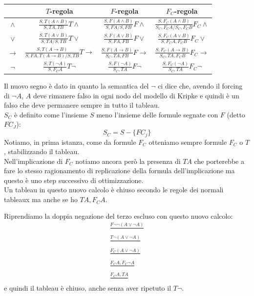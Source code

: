 \documentclass[a4paper,12pt, oneside]{book}
\begin{document}
\begin{table}[H]
  \large
  \centering
  \begin{tabular}{c||c|c|c}
    & {\small{$T$-regola}}& {\small{$F$-regola}} & {\small{$F_C$-regola}}\\
    \hline
    \hline
    $\land$ & $\frac{S,T(A\land B)}{S,TA,TB}T\land$&
              $\frac{S,F(A\land B)}{S,FA/S,FB}F\land$&
              $\frac{S,F_C(A\land B)}{S_C,F_CA/S_C,F_CB}F_C\land$\\ 
    \hline
    $\lor$ & $\frac{S,T(A\lor B)}{S,TA/S,TB}T\lor$&
                        $\frac{S,F(A\lor B)}{S,FA,FB}F\lor$&
                        $\frac{S,F_C(A\lor B)}{S,F_CA,F_CB}F_C\lor$\\
    \hline
    $\to$ & $\frac{S,T(A\to B)}{S,FA, T(A\to B)/S,TB}T\to$&
                        $\frac{S,F(A\to B)}{S_C,TA,FB}F\to$&
                        $\frac{S,F_C(A\to B)}{S_C,TA,F_CB}F_C\to$\\
    \hline
    $\neg$ & $\frac{S,T(\neg A)}{S,F_CA}T\neg$&
                        $\frac{S,F(\neg A)}{S_C,TA}F\neg$&
                        $\frac{S,F_C(\neg A)}{S_C,TA}F_C\neg$\\
    \hline
  \end{tabular}
\end{table}
Il nuovo segno è dato in quanto la semantica del $\neg$ ci dice che, avendo il
forcing di $\neg A$, $A$ deve rimanere falso in ogni nodo del modello di Kripke
e quindi è un falso che deve permanere sempre in tutto il tableau.\\
$S_C$ è definito come l'insieme $S$ meno l'insieme delle formule segnate con
$F$ (detto $FC_J$): 
\[S_C=S-\{FC_j\}\]
Notiamo, in prima istanza, come da formule $F_C$ otteniamo sempre formule $F_C$
o $T$, stabilizzando il tableau.\\
Nell'implicazione di $F_C$ notiamo ancora però la presenza di $TA$ che
porterebbe a fare lo stesso ragionamento di replicazione della formula
dell'implicazione ma questo è uno step successivo di ottimizzazione.\\
Un tableau in questo nuovo calcolo è chiuso secondo le regole dei normali
tableaux ma anche se ho $TA,F_CA$.
\begin{esempio}
  Riprendiamo la doppia negazione del terzo escluso con questo nuovo calcolo:
  \begin{gather*}
    \frac{F\neg \neg (A\lor \neg A)}{}\\
    \frac{T\neg(A\lor \neg A)}{}\\
    \frac{F_C (A\lor\neg A)}{}\\
    \frac{F_C A, F_C\neg A}{}\\
    \frac{F_C A, TA}{}
  \end{gather*}
  e quindi il tableau è chiuso, anche senza aver ripetuto il $T\neg$.
\end{esempio}
\end{document}
